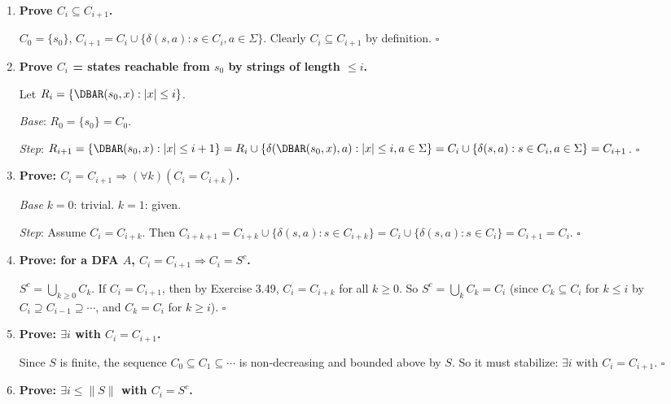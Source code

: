\begin{enumerate}[{3.}1.]
\begin{enumerate}
\item True: if $A\cong B$ then in particular $L(A)=L(B)$ (by Exercise 3.11).
\end{enumerate}

\item \textbf{Prove $C_i\subseteq C_{i+1}$.}

$C_0=\{s_0\}$, $C_{i+1}=C_i\cup\{\delta(s,a):s\in C_i,a\in\Sigma\}$. Clearly $C_i\subseteq C_{i+1}$ by definition. $\square$

\item \textbf{Prove $C_i$ = states reachable from $s_0$ by strings of length $\leq i$.}

Let $R_i=\{\DBAR(s_0,x):|x|\leq i\}$.

\textit{Base}: $R_0=\{s_0\}=C_0$. \checkmark

\textit{Step}: $R_{i+1}=\{\DBAR(s_0,x):|x|\leq i+1\}=R_i\cup\{\delta(\DBAR(s_0,x),a):|x|\leq i,a\in\Sigma\}=C_i\cup\{\delta(s,a):s\in C_i,a\in\Sigma\}=C_{i+1}$. $\square$

\item \textbf{Prove: $C_i=C_{i+1}\Rightarrow(\forall k)(C_i=C_{i+k})$.}

\textit{Base} $k=0$: trivial. $k=1$: given.

\textit{Step}: Assume $C_i=C_{i+k}$. Then $C_{i+k+1}=C_{i+k}\cup\{\delta(s,a):s\in C_{i+k}\}=C_i\cup\{\delta(s,a):s\in C_i\}=C_{i+1}=C_i$. $\square$

\item \textbf{Prove: for a DFA $A$, $C_i=C_{i+1}\Rightarrow C_i=S^c$.}

$S^c=\bigcup_{k\geq 0}C_k$. If $C_i=C_{i+1}$, then by Exercise 3.49, $C_i=C_{i+k}$ for all $k\geq 0$. So $S^c=\bigcup_k C_k=C_i$ (since $C_k\subseteq C_i$ for $k\leq i$ by $C_i\supseteq C_{i-1}\supseteq\cdots$, and $C_k=C_i$ for $k\geq i$). $\square$

\item \textbf{Prove: $\exists i$ with $C_i=C_{i+1}$.}

Since $S$ is finite, the sequence $C_0\subseteq C_1\subseteq\cdots$ is non-decreasing and bounded above by $S$. So it must stabilize: $\exists i$ with $C_i=C_{i+1}$. $\square$

\item \textbf{Prove: $\exists i\leq\|S\|$ with $C_i=S^c$.}


\end{enumerate}
